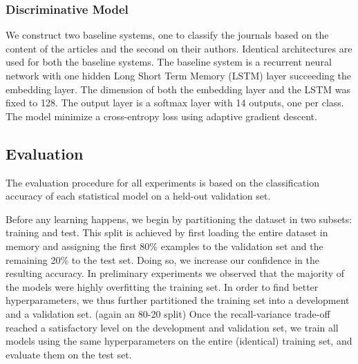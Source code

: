 \documentclass[12pt]{article}
\begin{document}
\subsubsection{Discriminative Model}

We construct two baseline systems, one to classify the journals based on the
content of the articles and the second on their authors. Identical architectures are used for both the baseline
systems. The baseline system is a recurrent neural network with one hidden Long
Short Term Memory (LSTM) layer succeeding the embedding layer. The dimension of
both the embedding layer and the LSTM was fixed to 128. The output layer is a
softmax layer with 14 outputs, one per class. The model minimize a cross-entropy loss using adaptive gradient descent. \cite{duchi2011adaptive}




\subsection{Evaluation}
The evaluation procedure for all experiments is based on the classification accuracy of each statistical model on a held-out validation set.

Before any learning happens, we begin by partitioning the dataset in two subsets: training and test. This split is achieved by first loading the entire dataset in memory and assigning the first 80\% examples to the validation set and the remaining 20\% to the test set. Doing so, we increase our confidence in the resulting accuracy. In preliminary experiments we observed that the majority of the models were highly overfitting the training set. In order to find better hyperparameters, we thus further partitioned the training set into a development and a validation set. (again an 80-20 split) Once the recall-variance trade-off reached a satisfactory level on the development and validation set, we train all models using the same hyperparameters on the entire (identical) training set, and evaluate them on the test set.
\end{document}
